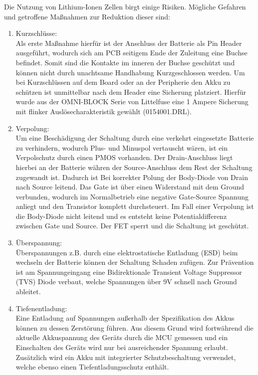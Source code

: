 Die Nutzung von Lithium-Ionen Zellen birgt einige Risiken. Mögliche Gefahren und getroffene Maßnahmen zur Reduktion dieser sind:

\begin{enumerate}
	\item Kurzschlüsse: \\
	Als erste Maßnahme hierfür ist der Anschluss der Batterie als Pin Header ausgeführt, wodurch sich am PCB seitigem Ende der Zuleitung eine Buchse befindet. Somit sind die Kontakte im inneren der Buchse geschützt und können nicht durch unachtsame Handhabung Kurzgeschlossen werden. Um bei Kurzschlüssen auf dem Board oder an der Peripherie den Akku zu schützen ist unmittelbar nach dem Header eine Sicherung platziert. Hierfür wurde aus der OMNI-BLOCK Serie von Littelfuse eine 1 Ampere Sicherung mit flinker Auslösecharakteristik gewählt (0154001.DRL). 
	
	\item Verpolung: \\
Um eine Beschädigung der Schaltung durch eine verkehrt eingesetzte Batterie zu verhindern, wodurch Plus- und Minuspol vertauscht wären, ist ein Verpolschutz durch einen PMOS vorhanden. Der Drain-Anschluss liegt hierbei an der Batterie währen der Source-Anschluss dem Rest der Schaltung zugewandt ist. Dadurch ist Bei korrekter Polung der Body-Diode von Drain nach Source leitend. Das Gate ist über einen Widerstand mit dem Ground verbunden, wodurch im Normalbetrieb eine negative Gate-Source Spannung anliegt und den Transistor komplett durchsteuert. Im Fall einer Verpolung ist die Body-Diode nicht leitend und es entsteht keine Potentialdifferenz zwischen Gate und Source. Der FET sperrt und die Schaltung ist geschützt.

	\item Überspannung:\\
	Überspannungen z.B. durch eine elektrostatische Entladung (ESD) beim wechseln der Batterie können der Schaltung Schaden zufügen. Zur Prävention ist am Spannungeingang eine Bidirektionale Transient Voltage Suppressor (TVS) Diode verbaut, welche Spannungen über 9V schnell nach Ground ableitet.
	
	\item Tiefenentladung:\\
	Eine Entladung auf Spannungen außerhalb der Spezifikation des Akkus können zu dessen Zerstörung führen. Aus diesem Grund wird fortwährend die aktuelle Akkuspannung des Geräts durch die MCU gemessen und ein Einschalten des Geräts wird nur bei ausreichender Spannung erlaubt. Zusätzlich wird ein Akku mit integrierter Schutzbeschaltung verwendet, welche ebenso einen Tiefentladungsschutz enthält.

\end{enumerate}

